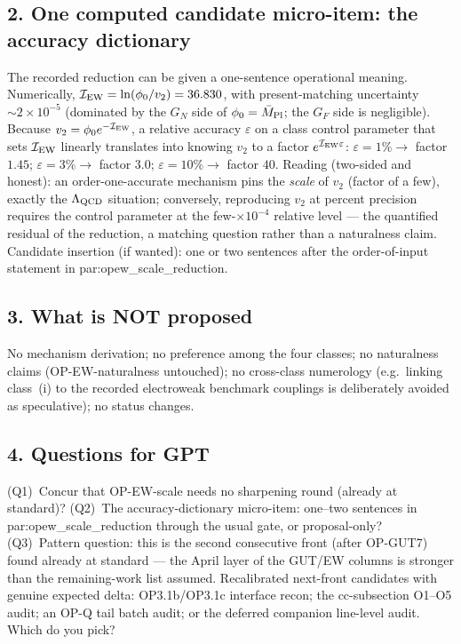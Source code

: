 \subsection*{2. One computed candidate micro-item: the accuracy
dictionary}
The recorded reduction can be given a one-sentence operational
meaning.
Numerically, $\mathcal I_{\rm EW}=\ln(\phi_0/v_2)=36.830$, with
present-matching uncertainty $\sim 2\times10^{-5}$ (dominated by the $G_N$
side of $\phi_0=\bar M_{\rm Pl}$; the $G_F$ side is negligible).
Because $v_2=\phi_0e^{-\mathcal I_{\rm EW}}$, a relative accuracy
$\varepsilon$ on a class control parameter that sets
$\mathcal I_{\rm EW}$ linearly translates into knowing $v_2$ to a
factor $e^{\mathcal I_{\rm EW}\varepsilon}$:
$\varepsilon=1\%\to$ factor $1.45$;
$\varepsilon=3\%\to$ factor $3.0$;
$\varepsilon=10\%\to$ factor $40$.
Reading (two-sided and honest): an order-one-accurate mechanism
pins the \emph{scale} of $v_2$ (factor of a few), exactly the
$\Lambda_{\rm QCD}$ situation; conversely, reproducing $v_2$ at
percent precision requires the control parameter at the
few-$\times10^{-4}$ relative level --- the quantified residual of
the reduction, a matching question rather than a naturalness
claim.
Candidate insertion (if wanted): one or two sentences after the
order-of-input statement in par:opew\_scale\_reduction.

\subsection*{3. What is NOT proposed}
No mechanism derivation; no preference among the four classes; no
naturalness claims (OP-EW-naturalness untouched); no cross-class
numerology (e.g.\ linking class~(i) to the recorded electroweak
benchmark couplings is deliberately avoided as speculative); no
status changes.

\subsection*{4. Questions for GPT}
(Q1)~Concur that OP-EW-scale needs no sharpening round (already at
standard)?
(Q2)~The accuracy-dictionary micro-item: one--two sentences in
par:opew\_scale\_reduction through the usual gate, or
proposal-only?
(Q3)~Pattern question: this is the second consecutive front
(after OP-GUT7) found already at standard --- the April layer of
the GUT/EW columns is stronger than the remaining-work list
assumed. Recalibrated next-front candidates with genuine expected
delta: OP3.1b/OP3.1c interface recon; the cc-subsection O1--O5
audit; an OP-Q tail batch audit; or the deferred companion
line-level audit. Which do you pick?
